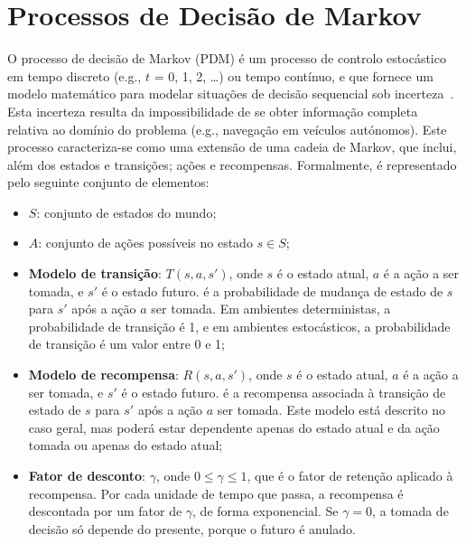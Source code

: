 \section{Processos de Decisão de Markov}\label{sec:processos-de-decisao-de-markov}

O processo de decisão de Markov (PDM) é um processo de controlo estocástico em tempo discreto (e.g., $t$ = 0, 1, 2, \ldots) ou tempo contínuo, e que fornece um modelo matemático para modelar situações de decisão sequencial sob incerteza~\cite{wiki:markov-decision-process}.
Esta incerteza resulta da impossibilidade de se obter informação completa relativa ao domínio do problema (e.g., navegação em veículos autónomos).
Este processo caracteriza-se como uma extensão de uma cadeia de Markov, que inclui, além dos estados e transições; ações e recompensas.
Formalmente, é representado pelo seguinte conjunto de elementos:

\begin{itemize}
    \label{itemize:processo-decisao-markov}
    \item \textbf{$S$}: conjunto de estados do mundo;
    \item \textbf{$A$}: conjunto de ações possíveis no estado $s \in S$;
    \item \textbf{Modelo de transição}: \( T(s, a, s') \), onde \( s \) é o estado atual, \( a \) é a ação a ser tomada, e \( s' \) é o estado futuro.
    é a probabilidade de mudança de estado de \( s \) para \( s' \) após a ação \( a \) ser tomada.
    Em ambientes deterministas, a probabilidade de transição é 1, e em ambientes estocásticos, a probabilidade de transição é um valor entre 0 e 1;
    \item \textbf{Modelo de recompensa}: \( R(s, a, s') \), onde \( s \) é o estado atual, \( a \) é a ação a ser tomada, e \( s' \) é o estado futuro.
    é a recompensa associada à transição de estado de \( s \) para \( s' \) após a ação \( a \) ser tomada.
    Este modelo está descrito no caso geral, mas poderá estar dependente apenas do estado atual e da ação tomada ou apenas do estado atual;
    \item \textbf{Fator de desconto}: \( \gamma \), onde \( 0 \leq \gamma \leq 1 \), que é o fator de retenção aplicado à recompensa.
    Por cada unidade de tempo que passa, a recompensa é descontada por um fator de \( \gamma \), de forma exponencial.
    Se \( \gamma = 0 \), a tomada de decisão só depende do presente, porque o futuro é anulado.
\end{itemize}

